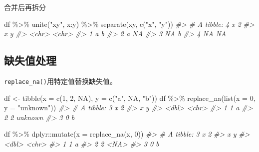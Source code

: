 \documentclass[
]{book}
\newenvironment{Shaded}{\begin{snugshade}}{\end{snugshade}}
\newcommand{\AttributeTok}[1]{\textcolor[rgb]{0.77,0.63,0.00}{#1}}
\newcommand{\CommentTok}[1]{\textcolor[rgb]{0.56,0.35,0.01}{\textit{#1}}}
\newcommand{\ConstantTok}[1]{\textcolor[rgb]{0.00,0.00,0.00}{#1}}
\newcommand{\DecValTok}[1]{\textcolor[rgb]{0.00,0.00,0.81}{#1}}
\newcommand{\FunctionTok}[1]{\textcolor[rgb]{0.00,0.00,0.00}{#1}}
\newcommand{\NormalTok}[1]{#1}
\newcommand{\OtherTok}[1]{\textcolor[rgb]{0.56,0.35,0.01}{#1}}
\newcommand{\SpecialCharTok}[1]{\textcolor[rgb]{0.00,0.00,0.00}{#1}}
\newcommand{\StringTok}[1]{\textcolor[rgb]{0.31,0.60,0.02}{#1}}
\begin{document}
合并后再拆分

\begin{Shaded}
\begin{Highlighting}[]
\NormalTok{df }\SpecialCharTok{\%\textgreater{}\%}
  \FunctionTok{unite}\NormalTok{(}\StringTok{"xy"}\NormalTok{, x}\SpecialCharTok{:}\NormalTok{y) }\SpecialCharTok{\%\textgreater{}\%}
  \FunctionTok{separate}\NormalTok{(xy, }\FunctionTok{c}\NormalTok{(}\StringTok{"x"}\NormalTok{, }\StringTok{"y"}\NormalTok{))}
\CommentTok{\#\textgreater{} \# A tibble: 4 x 2}
\CommentTok{\#\textgreater{}   x     y    }
\CommentTok{\#\textgreater{}   \textless{}chr\textgreater{} \textless{}chr\textgreater{}}
\CommentTok{\#\textgreater{} 1 a     b    }
\CommentTok{\#\textgreater{} 2 a     NA   }
\CommentTok{\#\textgreater{} 3 NA    b    }
\CommentTok{\#\textgreater{} 4 NA    NA}
\end{Highlighting}
\end{Shaded}

\hypertarget{ux7f3aux5931ux503cux5904ux7406}{%
\subsection{缺失值处理}\label{ux7f3aux5931ux503cux5904ux7406}}

\texttt{replace\_na()}用特定值替换缺失值。

\begin{Shaded}
\begin{Highlighting}[]
\NormalTok{df }\OtherTok{\textless{}{-}} \FunctionTok{tibble}\NormalTok{(}\AttributeTok{x =} \FunctionTok{c}\NormalTok{(}\DecValTok{1}\NormalTok{, }\DecValTok{2}\NormalTok{, }\ConstantTok{NA}\NormalTok{), }\AttributeTok{y =} \FunctionTok{c}\NormalTok{(}\StringTok{"a"}\NormalTok{, }\ConstantTok{NA}\NormalTok{, }\StringTok{"b"}\NormalTok{))}
\NormalTok{df }\SpecialCharTok{\%\textgreater{}\%} \FunctionTok{replace\_na}\NormalTok{(}\FunctionTok{list}\NormalTok{(}\AttributeTok{x =} \DecValTok{0}\NormalTok{, }\AttributeTok{y =} \StringTok{"unknown"}\NormalTok{))}
\CommentTok{\#\textgreater{} \# A tibble: 3 x 2}
\CommentTok{\#\textgreater{}       x y      }
\CommentTok{\#\textgreater{}   \textless{}dbl\textgreater{} \textless{}chr\textgreater{}  }
\CommentTok{\#\textgreater{} 1     1 a      }
\CommentTok{\#\textgreater{} 2     2 unknown}
\CommentTok{\#\textgreater{} 3     0 b}
\end{Highlighting}
\end{Shaded}

\begin{Shaded}
\begin{Highlighting}[]
\NormalTok{df }\SpecialCharTok{\%\textgreater{}\%}\NormalTok{ dplyr}\SpecialCharTok{::}\FunctionTok{mutate}\NormalTok{(}\AttributeTok{x =} \FunctionTok{replace\_na}\NormalTok{(x, }\DecValTok{0}\NormalTok{))}
\CommentTok{\#\textgreater{} \# A tibble: 3 x 2}
\CommentTok{\#\textgreater{}       x y    }
\CommentTok{\#\textgreater{}   \textless{}dbl\textgreater{} \textless{}chr\textgreater{}}
\CommentTok{\#\textgreater{} 1     1 a    }
\CommentTok{\#\textgreater{} 2     2 \textless{}NA\textgreater{} }
\CommentTok{\#\textgreater{} 3     0 b}
\end{Highlighting}
\end{Shaded}
\end{document}
